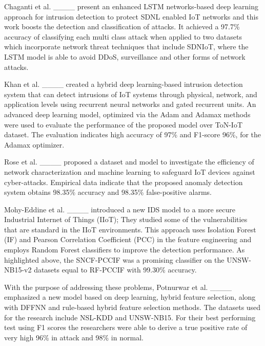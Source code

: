 Chaganti et al. ____ present an enhanced LSTM networks-based deep learning approach for intrusion detection to protect SDNL enabled IoT networks and this work boosts the detection and classification of attacks. It achieved a 97.7\% accuracy of classifying each multi class attack when applied to two datasets which incorporate network threat techniques that include SDNIoT, where the LSTM model is able to avoid DDoS, surveillance and other forms of network attacks.

Khan et al. ____ created a hybrid deep learning-based intrusion detection system that can detect intrusions of IoT systems through physical, network, and application levels using recurrent neural networks and gated recurrent units. An advanced deep learning model, optimized via the Adam and Adamax methods were used to evaluate the performance of the proposed model over ToN-IoT dataset.  The evaluation indicates high accuracy of 97\% and F1-score 96\%, for the Adamax optimizer.

Rose et al. ____ proposed a dataset and model to investigate the efficiency of network characterization and machine learning to safeguard IoT devices against cyber-attacks. Empirical data indicate that the proposed anomaly detection system obtains 98.35\% accuracy and 98.35\% false-positive alarms.

Mohy-Eddine et al. ____ introduced a new IDS model to a more secure Industrial Internet of Things (IIoT); They studied some of the vulnerabilities that are standard in the IIoT environments. This approach uses Isolation Forest (IF) and Pearson Correlation Coefficient (PCC) in the feature engineering and employs Random Forest classifiers to improve the detection performance. As highlighted above, the SNCF-PCCIF was a promising classifier on the UNSW-NB15-v2 datasets equal to RF-PCCIF with 99.30\% accuracy.


With the purpose of addressing these problems, Potnurwar et al. ____ emphasized a new model based on deep learning, hybrid feature selection, along with DFFNN and rule-based hybrid feature selection methods. The datasets used for the research include NSL-KDD and UNSW-NB15. For their best performing test using F1 scores the researchers were able to derive a true positive rate of very high 96\% in attack and 98\% in normal.